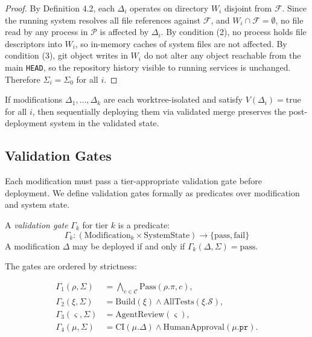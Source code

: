 \begin{proof}
By Definition 4.2, each $\Delta_i$ operates on directory $W_i$ disjoint from
$\mathcal{F}$. Since the running system resolves all file references against
$\mathcal{F}$, and $W_i \cap \mathcal{F} = \emptyset$, no file read by any
process in $\mathcal{P}$ is affected by $\Delta_i$. By condition (2), no process
holds file descriptors into $W_i$, so in-memory caches of system files are not
affected. By condition (3), git object writes in $W_i$ do not alter any object
reachable from the main \texttt{HEAD}, so the repository history visible to
running services is unchanged. Therefore $\Sigma_i = \Sigma_0$ for all $i$.
\end{proof}

\begin{corollary}
\label{cor:composition}
If modifications $\Delta_1, \ldots, \Delta_k$ are each worktree-isolated and
satisfy $V(\Delta_i) = \text{true}$ for all $i$, then sequentially deploying
them via validated merge preserves the post-deployment system in the validated
state.
\end{corollary}

\subsection{Validation Gates}
\label{sec:gates}

Each modification must pass a tier-appropriate validation gate before deployment.
We define validation gates formally as predicates over modification and system state.

\begin{definition}
A \emph{validation gate} $\Gamma_k$ for tier $k$ is a predicate:
\begin{equation}
    \Gamma_k : (\text{Modification}_k \times \text{SystemState}) \to \{\text{pass}, \text{fail}\}
\end{equation}
A modification $\Delta$ may be deployed if and only if $\Gamma_k(\Delta, \Sigma) = \text{pass}$.
\end{definition}

The gates are ordered by strictness:

\begin{align}
    \Gamma_1(\rho, \Sigma) &= \bigwedge_{c \in \mathcal{C}} \text{Pass}(\rho.\pi, c), \label{eq:gate1} \\
    \Gamma_2(\xi, \Sigma) &= \text{Build}(\xi) \wedge \text{AllTests}(\xi.\mathcal{S}), \label{eq:gate2} \\
    \Gamma_3(\varsigma, \Sigma) &= \text{AgentReview}(\varsigma), \label{eq:gate3} \\
    \Gamma_4(\mu, \Sigma) &= \text{CI}(\mu.\Delta) \wedge \text{HumanApproval}(\mu.\texttt{pr}). \label{eq:gate4}
\end{align}


